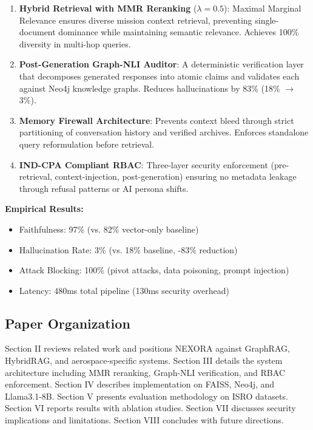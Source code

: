 \documentclass[journal,12pt,twocolumn]{IEEEtran}
\begin{document}
\begin{enumerate}
\item \textbf{Hybrid Retrieval with MMR Reranking} ($\lambda=0.5$): Maximal Marginal Relevance ensures diverse mission context retrieval, preventing single-document dominance while maintaining semantic relevance. Achieves 100\% diversity in multi-hop queries.

\item \textbf{Post-Generation Graph-NLI Auditor}: A deterministic verification layer that decomposes generated responses into atomic claims and validates each against Neo4j knowledge graphs. Reduces hallucinations by 83\% (18\% $\rightarrow$ 3\%).

\item \textbf{Memory Firewall Architecture}: Prevents context bleed through strict partitioning of conversation history and verified archives. Enforces standalone query reformulation before retrieval.

\item \textbf{IND-CPA Compliant RBAC}: Three-layer security enforcement (pre-retrieval, context-injection, post-generation) ensuring no metadata leakage through refusal patterns or AI persona shifts.
\end{enumerate}

\textbf{Empirical Results:}
\begin{itemize}
\item Faithfulness: 97\% (vs. 82\% vector-only baseline)
\item Hallucination Rate: 3\% (vs. 18\% baseline, -83\% reduction)
\item Attack Blocking: 100\% (pivot attacks, data poisoning, prompt injection)
\item Latency: 480ms total pipeline (130ms security overhead)
\end{itemize}

\subsection{Paper Organization}

Section II reviews related work and positions NEXORA against GraphRAG, HybridRAG, and aerospace-specific systems. Section III details the system architecture including MMR reranking, Graph-NLI verification, and RBAC enforcement. Section IV describes implementation on FAISS, Neo4j, and Llama3.1-8B. Section V presents evaluation methodology on ISRO datasets. Section VI reports results with ablation studies. Section VII discusses security implications and limitations. Section VIII concludes with future directions.
\end{document}
